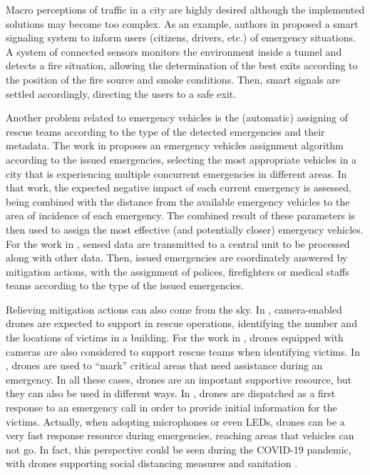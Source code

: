 \begin{refsection}
Macro perceptions of traffic in a city are highly desired although the implemented solutions may become too complex. As an example, authors in \cite{s150614370} proposed a smart signaling system to inform users (citizens, drivers, etc.) of emergency situations. A system of connected sensors monitors the environment inside a tunnel and detects a fire situation, allowing the determination of the best exits according to the position of the fire source and smoke conditions. Then, smart signals are settled accordingly, directing the users to a safe exit.

Another problem related to emergency vehicles is the (automatic) assigning of rescue teams according to the type of the detected emergencies and their metadata. The work in \cite{costa2020automatic} proposes an emergency vehicles assignment algorithm according to the issued emergencies, selecting the most appropriate vehicles in a city that is experiencing multiple concurrent emergencies in different areas. In that work, the expected negative impact of each current emergency is assessed, being combined with the distance from the available emergency vehicles to the area of incidence of each emergency. The combined result of these parameters is then used to assign the most effective (and potentially closer) emergency vehicles. For the work in \cite{mitigationurban2}, sensed data are transmitted to a central unit to be processed along with other data. Then, issued emergencies are coordinately answered by mitigation actions, with the assignment of polices, firefighters or medical staffs teams according to the type of the issued emergencies. 

Relieving mitigation actions can also come from the sky. In \cite{emergencyRescue3}, camera-enabled drones are expected to support in rescue operations, identifying the number and the locations of victims in a building. For the work in \cite{mitigationurban6}, drones equipped with cameras are also considered to support rescue teams when identifying victims. In \cite{mitigationAct5}, drones are used to ``mark'' critical areas that need assistance during an emergency. In all these cases, drones are an important supportive resource, but they can also be used in different ways. In \cite{mitigationurban8}, drones are dispatched as a first response to an emergency call in order to provide initial information for the victims. Actually, when adopting microphones or even LEDs, drones can be a very fast response resource during emergencies, reaching areas that vehicles can not go. In fact, this perspective could be seen during the COVID-19 pandemic, with drones supporting social distancing measures \cite{dronecovid1} and sanitation \cite{dronecovid2}.  



\end{refsection}
